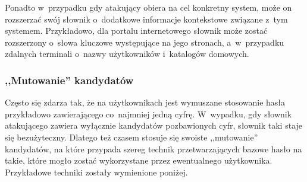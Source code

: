 Ponadto w~przypadku gdy atakujący obiera na cel konkretny system, może on
rozszerzać swój słownik o~dodatkowe informacje kontekstowe związane
z~tym systemem. Przykładowo, dla portalu internetowego słownik może zostać
rozszerzony o~słowa kluczowe występujące na jego stronach, a~w~przypadku
zdalnych terminali o~nazwy użytkowników i~katalogów domowych.



\subsubsection{,,Mutowanie'' kandydatów}
Często się zdarza tak, że na użytkownikach jest wymuszane stosowanie hasła
przykładowo zawierającego co~najmniej jedną cyfrę. W~wypadku, gdy słownik
atakującego zawiera wyłącznie kandydatów pozbawionych cyfr, słownik taki
staje się bezużyteczny. Dlatego też czasem stosuje się swoiste ,,mutowanie''
kandydatów, na które przypada szereg technik przetwarzających bazowe hasło na
takie, które mogło zostać wykorzystane przez ewentualnego użytkownika.
Przykładowe techniki zostały wymienione poniżej.

